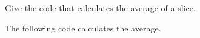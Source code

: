 \begin{Exercise}[title={Average},difficulty=4]
\label{ex:average no func}
\Question\label{ex:average no func q1} Give the code
that calculates the average of a  slice.
\end{Exercise}

\begin{Answer}
\Question The following code calculates the average.
\end{Answer}
